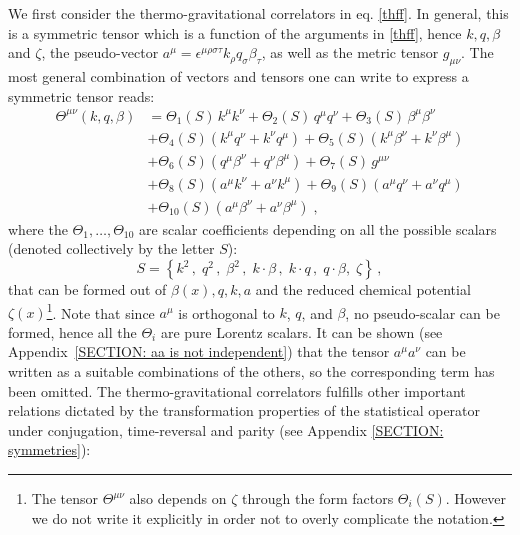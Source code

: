 \documentclass[prd,superscriptaddress,nofootinbib,notitlepage]{revtex4-1}
\begin{document}
We first consider the thermo-gravitational correlators in eq. \eqref{thff}. In general, this is a symmetric tensor 
which is a function of the arguments in \eqref{thff}, hence $k,q,\beta$ and $\zeta$, the pseudo-vector 
$a^\mu=\epsilon^{\mu\rho\sigma\tau}k_\rho q_\sigma \beta_\tau$, as well as the metric tensor $g_{\mu\nu}$. The most general 
combination of vectors and tensors one can write to express a symmetric tensor reads: 
%
\begin{equation}\label{inizialeT}
    \begin{split}
 \Theta^{\mu\nu}(k,q,\beta)
        &=\Theta_1(S)\,k^\mu k^\nu+\Theta_2(S)\,q^\mu q^\nu
        + \Theta_3(S)\,\beta^\mu \beta^\nu \\
        &+\Theta_4(S)\left(k^\mu q^\nu + k^\nu q^\mu\right)
        + \Theta_5(S)\left(k^\mu \beta^\nu + k^\nu \beta^\mu\right) \\
        &+ \Theta_6(S)\left(q^\mu \beta^\nu + q^\nu \beta^\mu\right)
        + \Theta_7(S)\,g^{\mu\nu} \\
        &  + \Theta_8(S)\left(a^\mu k^\nu + a^\nu k^\mu\right)
         + \Theta_{9}(S)\left(a^\mu q^\nu + a^\nu q^\mu\right)\\
         &+\Theta_{10}(S)\left(a^\mu\beta^\nu+a^\nu\beta^\mu\right)\;,
\end{split}
\end{equation}
%
where the $\Theta_1,\ldots,\Theta_{10}$ are scalar coefficients depending on all the possible scalars (denoted 
collectively by the letter $S$):
%
\begin{equation}\label{scalars}
    S=\left\{k^2\,,\; q^2\,,\; \beta^2\,,\; k\cdot\beta\,,\;k\cdot q\,,\; q\cdot\beta,\;\zeta\right\}\,,
\end{equation}
%
that can be formed out of $\beta(x), q, k ,a$ and the reduced chemical potential $\zeta(x)$\footnote{The tensor $\Theta^{\mu\nu}$ also depends on $\zeta$ through the form factors $\Theta_i(S)$. However we do not write it explicitly in order not to overly complicate the notation.}. 
Note that since $a^\mu$ is orthogonal to $k$, $q$, and $\beta$, no pseudo-scalar can be formed, hence all the $\Theta_i$ are pure Lorentz scalars.
It can be shown (see Appendix~\ref{SECTION: aa is not independent}) that the 
tensor $a^\mu a^\nu$ can be written as a suitable combinations of the others,
so the corresponding term has been omitted. The thermo-gravitational correlators fulfills other important relations 
dictated by the transformation properties of the statistical operator under conjugation, time-reversal and parity (see Appendix \ref{SECTION: symmetries}):
\end{document}
